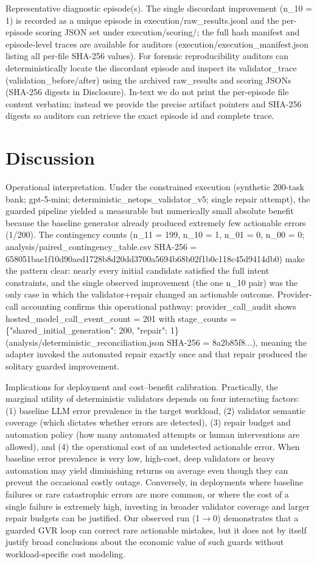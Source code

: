 \documentclass[conference]{IEEEtran}
\begin{document}
Representative diagnostic episode(s). The single discordant improvement (n\_10 = 1) is recorded as a unique episode in execution/raw\_results.jsonl and the per-episode scoring JSON set under execution/scoring/; the full hash manifest and episode-level traces are available for auditors (execution/execution\_manifest.json listing all per-file SHA-256 values). For forensic reproducibility auditors can deterministically locate the discordant episode and inspect its validator\_trace (validation\_before/after) using the archived raw\_results and scoring JSONs (SHA-256 digests in Disclosure). In-text we do not print the per-episode file content verbatim; instead we provide the precise artifact pointers and SHA-256 digests so auditors can retrieve the exact episode id and complete trace.

\section{Discussion}
Operational interpretation. Under the constrained execution (synthetic 200-task bank; gpt-5-mini; deterministic\_netops\_validator\_v5; single repair attempt), the guarded pipeline yielded a measurable but numerically small absolute benefit because the baseline generator already produced extremely few actionable errors (1/200). The contingency counts (n\_11 = 199, n\_10 = 1, n\_01 = 0, n\_00 = 0; analysis/paired\_contingency\_table.csv SHA-256 = 658051bae1f10d90aed1728b8d20dd3700a5694b68b02f1b0c118c45d9414db0) make the pattern clear: nearly every initial candidate satisfied the full intent constraints, and the single observed improvement (the one n\_10 pair) was the only case in which the validator+repair changed an actionable outcome. Provider-call accounting confirms this operational pathway: provider\_call\_audit shows hosted\_model\_call\_event\_count = 201 with stage\_counts = \{"shared\_initial\_generation": 200, "repair": 1\} (analysis/deterministic\_reconciliation.json SHA-256 = 8a2b85f8...), meaning the adapter invoked the automated repair exactly once and that repair produced the solitary guarded improvement.

Implications for deployment and cost--benefit calibration. Practically, the marginal utility of deterministic validators depends on four interacting factors: (1) baseline LLM error prevalence in the target workload, (2) validator semantic coverage (which dictates whether errors are detected), (3) repair budget and automation policy (how many automated attempts or human interventions are allowed), and (4) the operational cost of an undetected actionable error. When baseline error prevalence is very low, high-cost, deep validators or heavy automation may yield diminishing returns on average even though they can prevent the occasional costly outage. Conversely, in deployments where baseline failures or rare catastrophic errors are more common, or where the cost of a single failure is extremely high, investing in broader validator coverage and larger repair budgets can be justified. Our observed run (1\ensuremath{\rightarrow}0) demonstrates that a guarded GVR loop can correct rare actionable mistakes, but it does not by itself justify broad conclusions about the economic value of such guards without workload-specific cost modeling.
\end{document}
